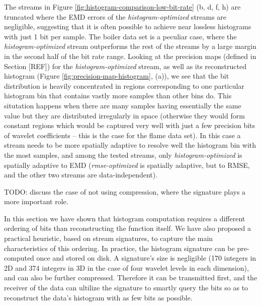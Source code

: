 The streams in Figure \ref{fig:histogram-comparison-low-bit-rate} (b, d, f, h) are truncated where
the EMD errors of the \emph{histogram-optimized} streams are negligible, suggesting that it is often
possible to achieve near lossless histograms with just 1 bit per sample. The boiler data set is a
peculiar case, where the \emph{histogram-optimized} stream outperforms the rest of the streams by a
large margin in the second half of the bit rate range. Looking at the precision maps (defined in
Section [REF]) for the \emph{histogram-optimized} stream, as well as its reconstructed histogram
(Figure \ref{fig:precision-map-histogram}, (a)), we see that the bit distribution is heavily
concentrated in regions corresponding to one particular histogram bin that contains vastly more
samples than other bins do. This situtation happens when there are many samples having essentially
the same value but they are distributed irregularly in space (otherwise they would form constant
regions which would be captured very well with just a few precision bits of wavelet coefficients --
this is the case for the flame data set). In this case a stream needs to be more spatially adaptive
to resolve well the histogram bin with the most samples, and among the tested streams, only
\emph{histogram-optimized} is spatially adaptive to EMD (\emph{rmse-optimized} is spatially
adaptive, but to RMSE, and the other two streams are data-independent).


TODO: discuss the case of not using compression, where the signature plays a more important role.

In this section we have shown that histogram computation requires a different ordering of bits than
reconstructing the function itself. We have also proposed a practical heuristic, based on stream
signatures, to capture the main characteristics of this ordering. In practice, the histogram
signature can be pre-computed once and stored on disk. A signature's size is negligible (170
integers in 2D and 374 integers in 3D in the case of four wavelet levels in each dimension), and can
also be further compressed. Therefore it can be transmitted first, and the receiver of the data can
ultilize the signature to smartly query the bits so as to reconstruct the data's histogram with as
few bits as possible.
